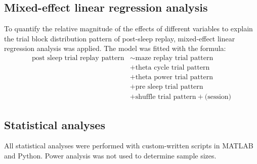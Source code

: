 \subsection{Mixed-effect linear regression analysis}

To quantify the relative magnitude of the effects of different variables to explain the trial block distribution pattern of post-sleep replay, mixed-effect linear regression analysis was applied. The model was fitted with the formula:
\begin{align*}
\text{post sleep trial replay pattern} &\sim \text{maze replay trial pattern} \\
&+ \text{theta cycle trial pattern} \\
&+ \text{theta power trial pattern} \\
&+ \text{pre sleep trial pattern} \\
&+ \text{shuffle trial pattern} + \text{(session)}
\end{align*}

\subsection{Statistical analyses}

All statistical analyses were performed with custom-written scripts in MATLAB and Python. Power analysis was not used to determine sample sizes.
